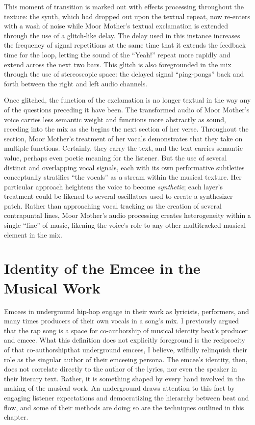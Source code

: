 This moment of transition is marked out with effects processing throughout the texture: the synth, which had dropped out
upon the textual repeat, now re-enters with a wash of noise while Moor Mother's textual exclamation is extended through
the use of a glitch-like delay. The delay used in this instance increases the frequency of signal repetitions at the same
time that it extends the feedback time for the loop, letting the sound of the ``Yeah!'' repeat more rapidly and extend
across the next two bars. This glitch is also foregrounded in the mix through the use of stereoscopic space: the delayed
signal ``ping-pongs'' back and forth between the right and left audio channels.

Once glitched, the function of the exclamation is no longer textual in the way any of the questions preceding it have been.
The transformed audio of Moor Mother's voice carries less semantic weight and functions more abstractly as sound, receding
into the mix as she begins the next section of her verse. Throughout the section, Moor Mother's treatment of her vocals
demonstrates that they take on multiple functions. Certainly, they carry the text, and the text carries semantic value, 
perhaps even poetic meaning for the listener. But the use of several distinct and overlapping vocal signals, each with its
own performative subtleties conceptually stratifies ``the vocals'' as a stream within the musical texture. Her particular
approach heightens the voice to become \emph{synthetic}; each layer's treatment could be likened to several oscillators used
to create a synthesizer patch. Rather than approaching vocal tracking as the creation of several contrapuntal lines, Moor
Mother's audio processing creates heterogeneity within a single ``line'' of music, likening the voice's role to any other
multitracked musical element in the mix.

\clearpage
\section{Identity of the Emcee in the Musical Work}
Emcees in underground hip-hop engage in their work as lyricists, performers, and many times producers of their own vocals
in a song's mix. I previously argued that the rap song is a space for co-authorship of musical identity beat's producer
and emcee. What this definition does not explicitly foreground is the reciprocity of that co-authorship\textemdash that 
underground emcees, I believe, wilfully relinquish their role as the singular author of their emceeing persona. The emcee's
identity, then, does not correlate directly to the author of the lyrics, nor even the speaker in their literary text. Rather,
it is something shaped by every hand involved in the making of the musical work. An underground draws attention to this fact
by engaging listener expectations and democratizing the hierarchy between beat and flow, and some of their methods are doing
so are the techniques outlined in this chapter.